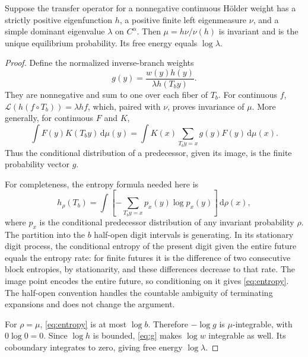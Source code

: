\documentclass[11pt,a4paper]{article}
\numberwithin{equation}{section}
\theoremstyle{definition}
\theoremstyle{remark}
\newcommand{\dd}{\,\mathrm d}
\newcommand{\Lop}{\mathcal L}
\begin{document}
\begin{lemma}
\label{lem:equilibrium}
Suppose the transfer operator for a nonnegative continuous H\"older
weight has a strictly positive eigenfunction $h$, a positive finite left
eigenmeasure $\nu$, and a simple dominant eigenvalue $\lambda$ on
$C^\alpha$. Then $\mu=h\nu/\nu(h)$ is invariant and is the unique
equilibrium probability. Its free energy equals $\log\lambda$.
\end{lemma}
\begin{proof}
Define the normalized inverse-branch weights
\begin{equation}
 g(y)=\frac{w(y)h(y)}{\lambda h(T_by)}.
 \label{eq:g}
\end{equation}
They are nonnegative and sum to one over each fiber of $T_b$.
For continuous $f$,
$\Lop(h(f\circ T_b))=\lambda hf$, which, paired with $\nu$, proves
invariance of $\mu$. More generally, for continuous $F$ and $K$,
\[
 \int F(y)K(T_by)\dd\mu(y)
 =\int K(x)\sum_{T_by=x}g(y)F(y)\dd\mu(x).
\]
Thus the conditional distribution of a predecessor, given its image,
is the finite probability vector $g$.

For completeness, the entropy formula needed here is
\begin{equation}
 h_\rho(T_b)=\int\left[-\sum_{T_by=x}p_x(y)\log p_x(y)\right]\dd\rho(x),
 \label{eq:entropy}
\end{equation}
where $p_x$ is the conditional predecessor distribution of any invariant
probability $\rho$. The partition into the $b$ half-open digit intervals
is generating. In its stationary digit process, the conditional entropy
of the present digit given the entire future equals the entropy rate:
for finite futures it is the difference of two consecutive block
entropies, by stationarity, and these differences decrease to that rate.
The image point encodes the entire future, so conditioning on it gives
\cref{eq:entropy}. The half-open convention handles the countable
ambiguity of terminating expansions and does not change the argument.

For $\rho=\mu$, \cref{eq:entropy} is at most $\log b$. Therefore
$-\log g$ is $\mu$-integrable, with $0\log0=0$. Since $\log h$ is bounded,
\cref{eq:g} makes $\log w$ integrable as well. Its coboundary integrates
to zero, giving free energy $\log\lambda$.


\end{proof}
\end{document}
